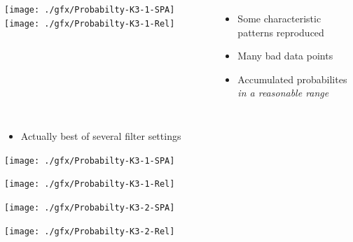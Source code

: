 
\begin{frame}
%
\begin{columns}[b]
	\texttt{[image: ./gfx/Probabilty-K3-1-SPA]}
%
	\texttt{[image: ./gfx/Probabilty-K3-1-Rel]}
	
	\begin{itemize}
	\item Some characteristic patterns reproduced
	\item Many bad data points
	\item Accumulated probabilites \emph{in a reasonable range}
	\end{itemize}
\end{columns}
\begin{itemize}
\item[\Thus] Actually best of several filter settings
\end{itemize}
%
%
%
%
\end{frame}


\begin{frame}
%
\begin{minipage}{.49\linewidth}
	\texttt{[image: ./gfx/Probabilty-K3-1-SPA]}
\end{minipage}
%
\begin{minipage}{.49\linewidth}
	\texttt{[image: ./gfx/Probabilty-K3-1-Rel]}
\end{minipage}
%
\begin{minipage}{.49\linewidth}
	\texttt{[image: ./gfx/Probabilty-K3-2-SPA]}
\end{minipage}
%
\begin{minipage}{.49\linewidth}
	\texttt{[image: ./gfx/Probabilty-K3-2-Rel]}
\end{minipage}
%
%
%
\end{frame}

